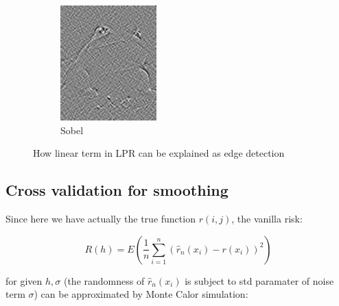 \documentclass{article}
\begin{document}
\begin{figure}[htb]
\begin{subfigure}[b]{0.24\linewidth}
    \includegraphics[width=\linewidth]{images/edge_4.png}
    \caption{Sobel}
  \end{subfigure}
  \caption{How linear term in LPR can be explained as edge detection}
  \label{fig:edge}
\end{figure}



\subsection{Cross validation for smoothing}


Since here we have actually the true function $r(i,j)$, the vanilla risk:

$$
R(h) = E(\frac{1}{n}\sum_{i=1}^n(\hat{r}_n(x_i)-r(x_i))^2)
$$

for given $h,\sigma$ (the randomness of $\hat{r}_n(x_i)$ is subject to std paramater of noise term $\sigma$) 
can be approximated by Monte Calor simulation:
\end{document}
